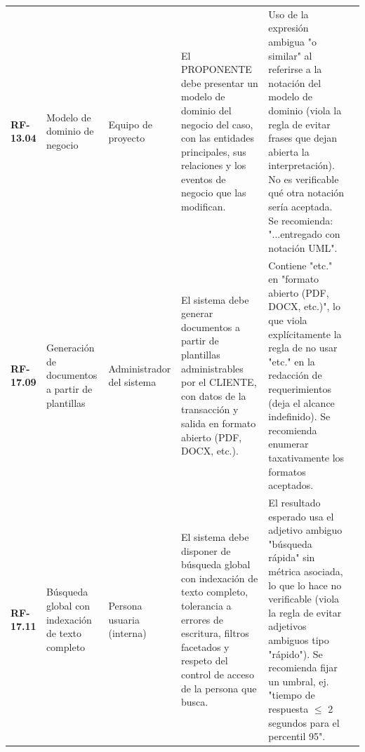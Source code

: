 \begin{longtable}{p{1.7cm} p{2.3cm} p{1.9cm} p{5.0cm} p{1.1cm} p{1.9cm}}
\textbf{RF-13.04} & Modelo de dominio de negocio & Equipo de proyecto & El PROPONENTE debe presentar un modelo de dominio del negocio del caso, con las entidades principales, sus relaciones y los eventos de negocio que las modifican. & Uso de la expresión ambigua "o similar" al referirse a la notación del modelo de dominio (viola la regla de evitar frases que dejan abierta la interpretación). No es verificable qué otra notación sería aceptada. Se recomienda: "...entregado con notación UML". &  \\
\textbf{RF-17.09} & Generación de documentos a partir de plantillas & Administrador del sistema & El sistema debe generar documentos a partir de plantillas administrables por el CLIENTE, con datos de la transacción y salida en formato abierto (PDF, DOCX, etc.). & Contiene "etc." en "formato abierto (PDF, DOCX, etc.)", lo que viola explícitamente la regla de no usar "etc." en la redacción de requerimientos (deja el alcance indefinido). Se recomienda enumerar taxativamente los formatos aceptados. &  \\
\textbf{RF-17.11} & Búsqueda global con indexación de texto completo & Persona usuaria (interna) & El sistema debe disponer de búsqueda global con indexación de texto completo, tolerancia a errores de escritura, filtros facetados y respeto del control de acceso de la persona que busca. & El resultado esperado usa el adjetivo ambiguo "búsqueda rápida" sin métrica asociada, lo que lo hace no verificable (viola la regla de evitar adjetivos ambiguos tipo "rápido"). Se recomienda fijar un umbral, ej. "tiempo de respuesta $\le$ 2 segundos para el percentil 95". &  \\
\end{longtable}

